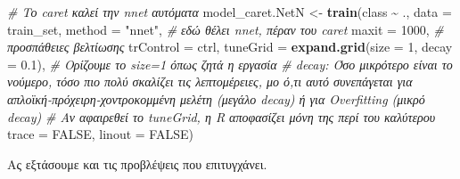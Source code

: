 \documentclass[
]{article}
\newenvironment{Shaded}{\begin{snugshade}}{\end{snugshade}}
\newcommand{\AttributeTok}[1]{\textcolor[rgb]{0.13,0.29,0.53}{#1}}
\newcommand{\CommentTok}[1]{\textcolor[rgb]{0.56,0.35,0.01}{\textit{#1}}}
\newcommand{\ConstantTok}[1]{\textcolor[rgb]{0.56,0.35,0.01}{#1}}
\newcommand{\DecValTok}[1]{\textcolor[rgb]{0.00,0.00,0.81}{#1}}
\newcommand{\FloatTok}[1]{\textcolor[rgb]{0.00,0.00,0.81}{#1}}
\newcommand{\FunctionTok}[1]{\textcolor[rgb]{0.13,0.29,0.53}{\textbf{#1}}}
\newcommand{\NormalTok}[1]{#1}
\newcommand{\OtherTok}[1]{\textcolor[rgb]{0.56,0.35,0.01}{#1}}
\newcommand{\SpecialCharTok}[1]{\textcolor[rgb]{0.81,0.36,0.00}{\textbf{#1}}}
\newcommand{\StringTok}[1]{\textcolor[rgb]{0.31,0.60,0.02}{#1}}
\begin{document}
\begin{Shaded}
\begin{Highlighting}[]
\CommentTok{\# Το caret καλεί την nnet αυτόματα}
\NormalTok{model\_caret.NetN }\OtherTok{\textless{}{-}} \FunctionTok{train}\NormalTok{(class }\SpecialCharTok{\textasciitilde{}}\NormalTok{ ., }
                     \AttributeTok{data =}\NormalTok{ train\_set, }
                     \AttributeTok{method =} \StringTok{"nnet"}\NormalTok{, }\CommentTok{\# εδώ θέλει nnet, πέραν του caret}
                     \AttributeTok{maxit =} \DecValTok{1000}\NormalTok{, }\CommentTok{\# προσπάθειες βελτίωσης}
                     \AttributeTok{trControl =}\NormalTok{ ctrl,}
                     \AttributeTok{tuneGrid =} \FunctionTok{expand.grid}\NormalTok{(}\AttributeTok{size =} \DecValTok{1}\NormalTok{, }\AttributeTok{decay =} \FloatTok{0.1}\NormalTok{), }
                     \CommentTok{\# Ορίζουμε το size=1 όπως ζητά η εργασία}
                     \CommentTok{\# decay: Όσο μικρότερο είναι το νούμερο, τόσο πιο πολύ σκαλίζει τις λεπτομέρειες, μο ό,τι αυτό συνεπάγεται για απλοϊκή{-}πρόχειρη{-}χοντροκομμένη μελέτη (μεγάλο decay) ή για Overfitting (μικρό decay)}
                     \CommentTok{\# Αν αφαιρεθεί το tuneGrid, η R αποφασίζει μόνη της περί του καλύτερου}
                     \AttributeTok{trace =} \ConstantTok{FALSE}\NormalTok{,}
                     \AttributeTok{linout =} \ConstantTok{FALSE}\NormalTok{)}
\end{Highlighting}
\end{Shaded}

Ας εξτάσουμε και τις προβλέψεις που επιτυγχάνει.

\begin{Shaded}
\end{Shaded}
\end{document}

